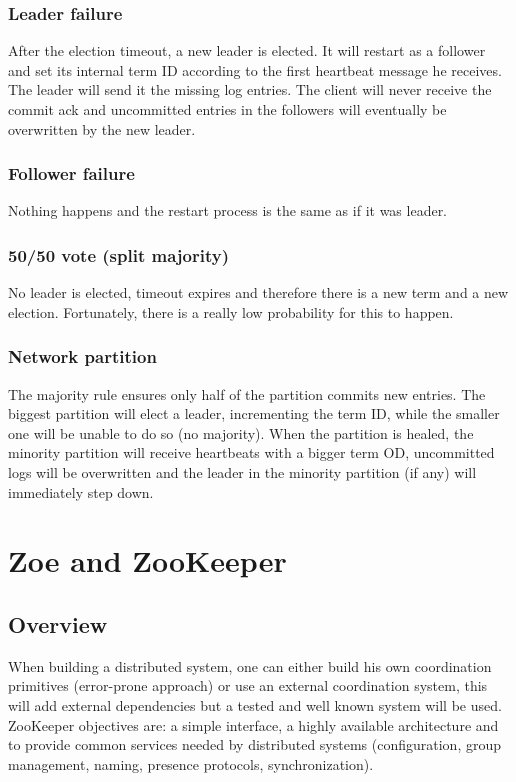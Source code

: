 		\subsubsection{Leader failure}
			After the election timeout, a new leader is elected.\newline
			It will restart as a follower and set its internal term ID according to the first heartbeat message he receives. The leader will send it the missing log entries.\newline
			The client will never receive the commit ack and uncommitted entries in the followers will eventually be overwritten by the new leader.
		\subsubsection{Follower failure}
			Nothing happens and the restart process is the same as if it was leader.
		\subsubsection{50/50 vote (split majority)}
			No leader is elected, timeout expires and therefore there is a new term and a new election.\newline
			Fortunately, there is a really low probability for this to happen.
		\subsubsection{Network partition}
			The majority rule ensures only half of the partition commits new entries.\newline
			The biggest partition will elect a leader, incrementing the term ID, while the smaller one will be unable to do so (no majority).\newline
			When the partition is healed, the minority partition will receive heartbeats with a bigger term OD, uncommitted logs will be overwritten and the leader in the minority partition (if any) will immediately step down.
\section{Zoe and ZooKeeper}
	\subsection{Overview}
		When building a distributed system, one can either build his own coordination primitives (error-prone approach) or use an external coordination system, this will add external dependencies but a tested and well known system will be used.\newline
		\newline
		ZooKeeper objectives are: a simple interface, a highly available architecture and to provide common services needed by distributed systems (configuration, group management, naming, presence protocols, synchronization).
